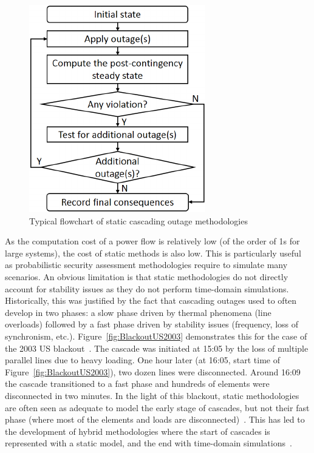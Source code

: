 \begin{figure}
    \centering
    \includegraphics[width=0.4\linewidth]{Figs/QSS_flowchart.pdf}
    \caption{Typical flowchart of static cascading outage methodologies~\cite{Benchmarking2018}}
    \label{fig:QSS_flowchart}
\end{figure}

As the computation cost of a power flow is relatively low (of the order of 1s for large systems), the cost of static methods is also low. This is particularly useful as probabilistic security assessment methodologies require to simulate many scenarios. An obvious limitation is that static methodologies do not directly account for stability issues as they do not perform time-domain simulations. Historically, this was justified by the fact that cascading outages used to often develop in two phases: a slow phase driven by thermal phenomena (line overloads) followed by a fast phase driven by stability issues (frequency, loss of synchronism, etc.). Figure~\ref{fig:BlackoutUS2003} demonstrates this for the case of the 2003 US blackout~\cite{USBlackout2003}. The cascade was initiated at 15:05 by the loss of multiple parallel lines due to heavy loading. One hour later (at 16:05, start time of Figure~\ref{fig:BlackoutUS2003}), two dozen lines were disconnected. Around 16:09 the cascade transitioned to a fast phase and hundreds of elements were disconnected in two minutes. In the light of this blackout, static methodologies are often seen as adequate to model the early stage of cascades, but not their fast phase (where most of the elements and loads are disconnected)~\cite{BenchmarkingStaticVsDynamic}. This has led to the development of hybrid methodologies where the start of cascades is represented with a static model, and the end with time-domain simulations~\cite{TwoLevelPSA, DCATphase1}.


